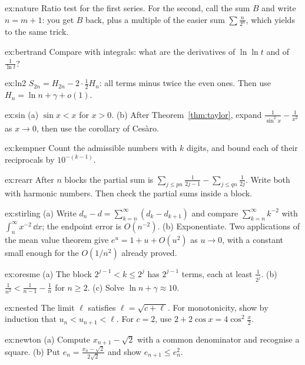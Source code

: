 \begin{hint}{ex:nature}
Ratio test for the first series. For the second, call the sum $B$ and write $n=m+1$: you get $B$ back, plus a multiple of the easier sum $\sum\frac n{2^n}$, which yields to the same trick.
\end{hint}
\begin{hint}{ex:bertrand}
Compare with integrals: what are the derivatives of $\ln\ln t$ and of $\frac1{\ln t}$?
\end{hint}
\begin{hint}{ex:ln2}
$S_{2n}=H_{2n}-2\cdot\frac12H_n$: all terms minus twice the even ones. Then use $H_n=\ln n+\gamma+o(1)$.
\end{hint}
\begin{hint}{ex:sin}
(a) $\sin x<x$ for $x>0$. (b) After Theorem~\ref{thm:taylor}, expand $\frac1{\sin^2x}-\frac1{x^2}$ as $x\to0$, then use the corollary of Ces\`aro.
\end{hint}
\begin{hint}{ex:kempner}
Count the admissible numbers with $k$ digits, and bound each of their reciprocals by $10^{-(k-1)}$.
\end{hint}
\begin{hint}{ex:rearr}
After $n$ blocks the partial sum is $\sum_{j\le pn}\frac1{2j-1}-\sum_{j\le qn}\frac1{2j}$. Write both with harmonic numbers. Then check the partial sums inside a block.
\end{hint}
\begin{hint}{ex:stirling}
(a) Write $d_n-d=\sum_{k=n}^\infty(d_k-d_{k+1})$ and compare $\sum_{k=n}^\infty k^{-2}$ with $\int_n^\infty x^{-2}\,\dd x$; the endpoint error is $O(n^{-2})$. (b) Exponentiate. Two applications of the mean value theorem give $e^u=1+u+O(u^2)$ as $u\to0$, with a constant small enough for the $O(1/n^2)$ already proved.
\end{hint}
\begin{hint}{ex:oresme}
(a) The block $2^{j-1}<k\le2^j$ has $2^{j-1}$ terms, each at least $\frac1{2^j}$. (b) $\frac1{n^2}<\frac1{n-1}-\frac1n$ for $n\ge2$. (c) Solve $\ln n+\gamma\approx10$.
\end{hint}
\begin{hint}{ex:nested}
The limit $\ell$ satisfies $\ell=\sqrt{c+\ell}$. For monotonicity, show by induction that $u_n<u_{n+1}<\ell$. For $c=2$, use $2+2\cos x=4\cos^2\frac x2$.
\end{hint}
\begin{hint}{ex:newton}
(a) Compute $x_{n+1}-\sqrt2$ with a common denominator and recognise a square. (b) Put $e_n=\frac{x_n-\sqrt2}{2\sqrt2}$ and show $e_{n+1}\le e_n^2$.
\end{hint}
